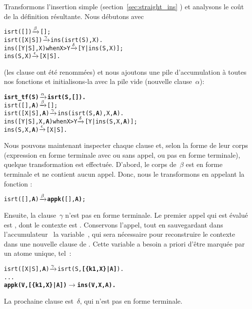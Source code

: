 Transformons l'insertion simple (section~\ref{sec:straight_ins}
) et analysons le coût de la définition
résultante. Nous débutons avec
\begin{alltt}
isrt(   [])             \(\smashedrightarrow{\beta}\) [];
isrt([X|S])             \(\smashedrightarrow{\gamma}\) ins(isrt(S),X).
ins([Y|S],X) when X > Y \(\smashedrightarrow{\delta}\) [Y|ins(S,X)];
ins(    S,X)            \(\smashedrightarrow{\epsilon}\) [X|S].
\end{alltt}
(les clause ont été renommées) et nous ajoutons une pile
d'accumulation à toutes nos fonctions et initialisons-la avec la pile
vide (nouvelle clause~\(\alpha\)):
\begin{alltt}
\textbf{isrt_tf(S)                \(\smashedrightarrow{\alpha}\) isrt(S,[]).}
isrt(   [],\textbf{A})             \(\smashedrightarrow{\beta}\) [];\hfill% A \emph{inutile pour le moment}
isrt([X|S],\textbf{A})             \(\smashedrightarrow{\gamma}\) ins(isrt(S,\textbf{A}),X,\textbf{A}).
ins([Y|S],X,\textbf{A}) when X > Y \(\smashedrightarrow{\delta}\) [Y|ins(S,X,\textbf{A})];
ins(    S,X,\textbf{A})            \(\smashedrightarrow{\epsilon}\) [X|S].\hfill% A \emph{inutile}
\end{alltt}
Nous pouvons maintenant inspecter chaque clause et, selon la forme de
leur corps (expression en forme terminale avec ou sans appel, ou pas
en forme terminale), quelque transformation est effectuée. D'abord, le
corps de~\(\beta\) est en forme terminale et ne contient aucun
appel. Donc, nous le transformons en appelant la fonction
:
\begin{alltt}
isrt(   [],\textbf{A})             \(\smashedrightarrow{\beta}\) \textbf{appk(}[],\textbf{A)};
\end{alltt}
Ensuite, la clause~\(\gamma\) n'est pas en forme terminale. Le premier
appel qui est évalué est , dont le contexte est
. Conservons l'appel, tout en
sauvegardant dans l'accumulateur~ la variable~,
qui sera nécessaire pour reconstruire le contexte dans une nouvelle
clause de . Cette variable a besoin a priori d'être
marquée par un atome unique, tel~:
\begin{alltt}
isrt([X|S],\textbf{A})             \(\smashedrightarrow{\gamma}\) isrt(S,\textbf{[\{k1,X\}|A]}).
...
\textbf{appk(V,[\{k1,X\}|A])        \(\rightarrow\) ins(V,X,A).}
\end{alltt}
La prochaine clause est~\(\delta\), qui n'est pas en forme terminale.
